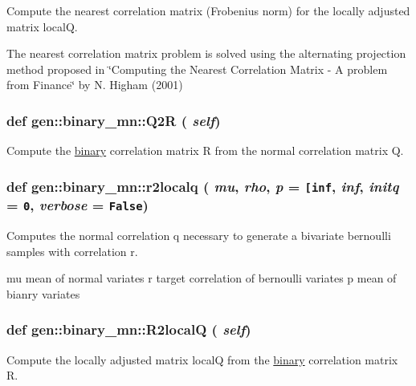 Compute the nearest correlation matrix (Frobenius norm) for the locally adjusted matrix localQ. 

The nearest correlation matrix problem is solved using the alternating projection method proposed in \char`\"{}Computing the Nearest Correlation Matrix - A problem from Finance\char`\"{} by N. Higham (2001) \hypertarget{classgen_1_1binary__mn_4d8919d948c2946f8c2f3a2467718ff9}{
\subsubsection[{Q2R}]{\setlength{\rightskip}{0pt plus 5cm}def gen::binary\_\-mn::Q2R ( {\em self})}}
\label{classgen_1_1binary__mn_4d8919d948c2946f8c2f3a2467718ff9}


Compute the \hyperlink{classgen_1_1binary}{binary} correlation matrix R from the normal correlation matrix Q. 

\hypertarget{classgen_1_1binary__mn_f8d4b9ee7e9ed2ed06c4da3b2babaadf}{
\subsubsection[{r2localq}]{\setlength{\rightskip}{0pt plus 5cm}def {\bf gen::binary\_\-mn::r2localq} ( {\em mu}, \/   {\em rho}, \/   {\em p} = {\tt \mbox{[}inf}, \/   {\em inf}, \/   {\em initq} = {\tt 0}, \/   {\em verbose} = {\tt False})}}
\label{classgen_1_1binary__mn_f8d4b9ee7e9ed2ed06c4da3b2babaadf}


Computes the normal correlation q necessary to generate a bivariate bernoulli samples with correlation r. 

mu mean of normal variates r target correlation of bernoulli variates p mean of bianry variates \hypertarget{classgen_1_1binary__mn_698853fe63226716476aa5a4bf9df76c}{
\subsubsection[{R2localQ}]{\setlength{\rightskip}{0pt plus 5cm}def gen::binary\_\-mn::R2localQ ( {\em self})}}
\label{classgen_1_1binary__mn_698853fe63226716476aa5a4bf9df76c}


Compute the locally adjusted matrix localQ from the \hyperlink{classgen_1_1binary}{binary} correlation matrix R. 

